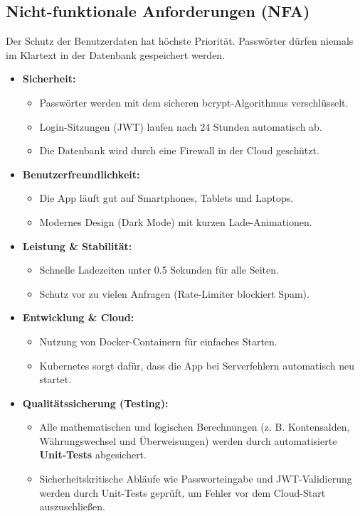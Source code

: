 \documentclass[11pt,a4paper]{article}
\begin{document}
\subsection{Nicht-funktionale Anforderungen (NFA)}

\begin{tcolorbox}[colback=bglight, colframe=accentgreen, arc=4pt, title=\textbf{\color{white}Sicherheit \& DSGVO}]
Der Schutz der Benutzerdaten hat höchste Priorität. Passwörter dürfen niemals im Klartext in der Datenbank gespeichert werden.
\end{tcolorbox}

\begin{itemize}
    \item \textbf{\color{accentblue}Sicherheit:}
    \begin{itemize}
        \item Passwörter werden mit dem sicheren bcrypt-Algorithmus verschlüsselt.
        \item Login-Sitzungen (JWT) laufen nach 24 Stunden automatisch ab.
        \item Die Datenbank wird durch eine Firewall in der Cloud geschützt.
    \end{itemize}
    \item \textbf{\color{accentblue}Benutzerfreundlichkeit:}
    \begin{itemize}
        \item Die App läuft gut auf Smartphones, Tablets und Laptops.
        \item Modernes Design (Dark Mode) mit kurzen Lade-Animationen.
    \end{itemize}
    \item \textbf{\color{accentblue}Leistung \& Stabilität:}
    \begin{itemize}
        \item Schnelle Ladezeiten unter 0.5 Sekunden für alle Seiten.
        \item Schutz vor zu vielen Anfragen (Rate-Limiter blockiert Spam).
    \end{itemize}
    \item \textbf{\color{accentblue}Entwicklung \& Cloud:}
    \begin{itemize}
        \item Nutzung von Docker-Containern für einfaches Starten.
        \item Kubernetes sorgt dafür, dass die App bei Serverfehlern automatisch neu startet.
    \end{itemize}
    \item \textbf{\color{accentblue}Qualitätssicherung (Testing):}
    \begin{itemize}
        \item Alle mathematischen und logischen Berechnungen (z. B. Kontensalden, Währungswechsel und Überweisungen) werden durch automatisierte \textbf{Unit-Tests} abgesichert.
        \item Sicherheitskritische Abläufe wie Passworteingabe und JWT-Validierung werden durch Unit-Tests geprüft, um Fehler vor dem Cloud-Start auszuschließen.
    \end{itemize}
\end{itemize}
\end{document}
